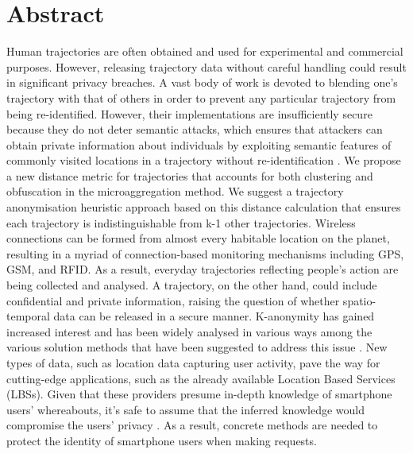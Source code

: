 \section*{Abstract}
Human trajectories are often obtained and used for experimental and commercial purposes. However, releasing trajectory data without careful handling could result in significant privacy breaches. A vast body of work is devoted to blending one's trajectory with that of others in order to prevent any particular trajectory from being re-identified. However, their implementations are insufficiently secure because they do not deter semantic attacks, which ensures that attackers can obtain private information about individuals by exploiting semantic features of commonly visited locations in a trajectory without re-identification \cite{tu2017beyond}. We propose a new distance metric for trajectories that accounts for both clustering and obfuscation in the microaggregation method. We suggest a trajectory anonymisation heuristic approach based on this distance calculation that ensures each trajectory is indistinguishable from k-1 other trajectories. Wireless connections can be formed from almost every habitable location on the planet, resulting in a myriad of connection-based monitoring mechanisms including GPS, GSM, and RFID. As a result, everyday trajectories reflecting people's action are being collected and analysed. A trajectory, on the other hand, could include confidential and private information, raising the question of whether spatio-temporal data can be released in a secure manner. K-anonymity has gained increased interest and has been widely analysed in various ways among the various solution methods that have been suggested to address this issue \cite{gkoulalas2010providing}. New types of data, such as location data capturing user activity, pave the way for cutting-edge applications, such as the already available Location Based Services (LBSs). Given that these providers presume in-depth knowledge of smartphone users' whereabouts, it's safe to assume that the inferred knowledge would compromise the users' privacy . As a result, concrete methods are needed to protect the identity of smartphone users when making requests.